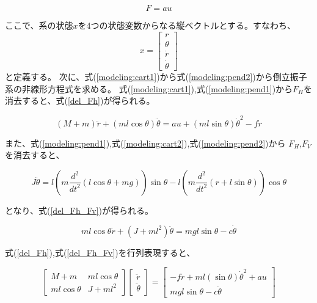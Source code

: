 \documentclass[a4j,11pt,twoside]{jbook}
\begin{document}
\begin{equation}
    F = au
    \label{F}
\end{equation}

ここで、系の状態$x$を4つの状態変数からなる縦ベクトルとする。すなわち、
$$
    x = \left [
    \begin{array}{c}
        r \\
        \theta \\
        \dot r \\
        \dot \theta
    \end{array}
    \right ]
$$
と定義する。
次に、式(\ref{modeling:cart1})から式(\ref{modeling:pend2})から倒立振子系の非線形方程式を求める。
式(\ref{modeling:cart1}),式(\ref{modeling:pend1})から$F_{H}$を消去すると、式(\ref{del_Fh})が得られる。

\begin{equation}
    (M + m) \ddot r + (ml\cos \theta) \ddot \theta = au + (ml\sin \theta) \dot \theta^2 - f \dot r
    \label{del_Fh}
\end{equation}

また、式(\ref{modeling:pend1}),式(\ref{modeling:cart2}),式(\ref{modeling:pend2})から
$F_{H}$,$F_{V}$を消去すると、

$$
    J \ddot \theta = l\left(
        m\frac{d^2}{dt^2}\left(
            l\cos \theta + mg
            \right)
        \right)\sin \theta
        -
        l\left(
            m\frac{d^2}{dt^2}\left(
                r + l\sin \theta
            \right)
        \right)\cos \theta
$$

となり、式(\ref{del_Fh_Fv})が得られる。

\begin{equation}
    ml\cos \theta \ddot r + (J + ml^2) \ddot \theta = mgl\sin \theta -c \dot \theta
    \label{del_Fh_Fv}
\end{equation}

式(\ref{del_Fh}),式(\ref{del_Fh_Fv})を行列表現すると、

$$
    \left[
    \begin{array}{cc}
        M + m          &  ml\cos \theta \\
        ml\cos \theta  &  J + ml^2
    \end{array}
    \right]
    \left[
    \begin{array}{c}
        \ddot r \\
        \ddot \theta
    \end{array}    
    \right]
    =
    \left[
        \begin{array}{c}
            -f \dot r + ml(\sin \theta) \dot \theta^2 + au \\
            mgl\sin \theta - c \dot \theta
        \end{array}
    \right]
$$
\end{document}
